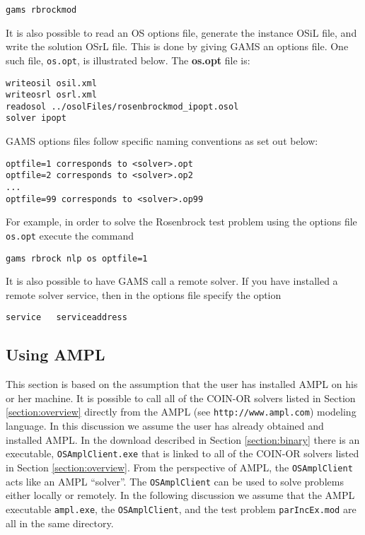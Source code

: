 \documentclass[11pt]{article}
\renewcommand{\{}{{\char"7B}}
\renewcommand{\}}{{\char"7D}}
\renewcommand{\^}{{\char"0D}}
\renewcommand{\'}{{\char"0D}}
\begin{document}
\begin{verbatim}
gams rbrockmod
\end{verbatim}

It is also possible to read an OS options file, generate the instance OSiL file, and write the solution  OSrL file.
This is done by giving GAMS an options file. One such file, {\tt os.opt}, is illustrated below. The {\bf os.opt} file is:

\begin{verbatim}
writeosil osil.xml
writeosrl osrl.xml
readosol ../osolFiles/rosenbrockmod_ipopt.osol
solver ipopt
\end{verbatim}

GAMS options files follow specific naming conventions as set out below:

\begin{verbatim}
optfile=1 corresponds to <solver>.opt
optfile=2 corresponds to <solver>.op2
...
optfile=99 corresponds to <solver>.op99
\end{verbatim}

For example, in order to solve the Rosenbrock test problem using the  options file  {\tt os.opt}
execute the command

\begin{verbatim}
gams rbrock nlp os optfile=1
\end{verbatim}


It is also possible to have GAMS call a remote solver. If you have installed a remote solver service, then in the options file specify the option

\begin{verbatim}
service   serviceaddress
\end{verbatim}



\subsection{Using AMPL}\label{section:ampl}

This section is based on the assumption that the user has installed  AMPL  on his or her machine.   It is possible to call all of the COIN-OR solvers listed in Section \ref{section:overview} directly from the  AMPL 
(see {\tt http://www.ampl.com}) modeling language.  In this discussion we assume the user has already obtained and 
installed AMPL.  In  the download described in Section \ref{section:binary} there is an executable, {\tt OSAmplClient.exe}  that is linked to all of the COIN-OR solvers  listed in Section \ref{section:overview}.   From the  perspective of AMPL, the   {\tt OSAmplClient} acts 
like an AMPL ``solver''.    The {\tt OSAmplClient}   can be used 
to solve problems either locally or remotely.   
In the following discussion we assume that the AMPL executable {\tt ampl.exe}, the {\tt OSAmplClient},  and the test problem {\tt  parIncEx.mod} are all in the same directory.  
\end{document}
